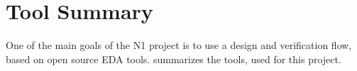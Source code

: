 
\section{Tool Summary}
\label{tools}

One of the main goals of the N1 project is to use a design and verification flow,
based on open source EDA tools.  summarizes the tools, used for
this project. 

